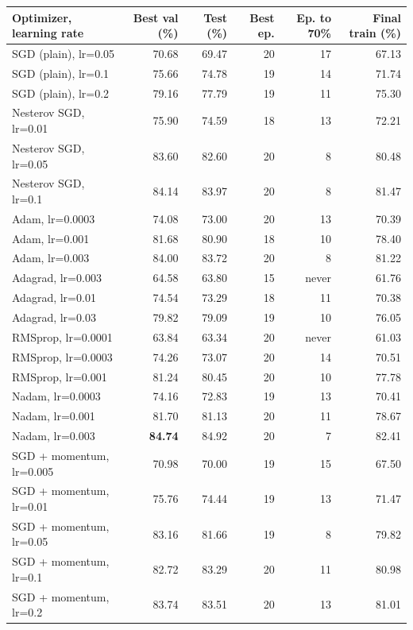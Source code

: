 \begin{tabular}{lrrrrr}
\toprule
Optimizer, learning rate & Best val (\%) & Test (\%) & Best ep. & Ep. to 70\% & Final train (\%) \\
\midrule
SGD (plain), lr=0.05 & 70.68 & 69.47 & 20 & 17 & 67.13 \\
SGD (plain), lr=0.1 & 75.66 & 74.78 & 19 & 14 & 71.74 \\
SGD (plain), lr=0.2 & 79.16 & 77.79 & 19 & 11 & 75.30 \\
Nesterov SGD, lr=0.01 & 75.90 & 74.59 & 18 & 13 & 72.21 \\
Nesterov SGD, lr=0.05 & 83.60 & 82.60 & 20 & 8 & 80.48 \\
Nesterov SGD, lr=0.1 & 84.14 & 83.97 & 20 & 8 & 81.47 \\
Adam, lr=0.0003 & 74.08 & 73.00 & 20 & 13 & 70.39 \\
Adam, lr=0.001 & 81.68 & 80.90 & 18 & 10 & 78.40 \\
Adam, lr=0.003 & 84.00 & 83.72 & 20 & 8 & 81.22 \\
Adagrad, lr=0.003 & 64.58 & 63.80 & 15 & never & 61.76 \\
Adagrad, lr=0.01 & 74.54 & 73.29 & 18 & 11 & 70.38 \\
Adagrad, lr=0.03 & 79.82 & 79.09 & 19 & 10 & 76.05 \\
RMSprop, lr=0.0001 & 63.84 & 63.34 & 20 & never & 61.03 \\
RMSprop, lr=0.0003 & 74.26 & 73.07 & 20 & 14 & 70.51 \\
RMSprop, lr=0.001 & 81.24 & 80.45 & 20 & 10 & 77.78 \\
Nadam, lr=0.0003 & 74.16 & 72.83 & 19 & 13 & 70.41 \\
Nadam, lr=0.001 & 81.70 & 81.13 & 20 & 11 & 78.67 \\
Nadam, lr=0.003 & \textbf{84.74} & 84.92 & 20 & 7 & 82.41 \\
SGD + momentum, lr=0.005 & 70.98 & 70.00 & 19 & 15 & 67.50 \\
SGD + momentum, lr=0.01 & 75.76 & 74.44 & 19 & 13 & 71.47 \\
SGD + momentum, lr=0.05 & 83.16 & 81.66 & 19 & 8 & 79.82 \\
SGD + momentum, lr=0.1 & 82.72 & 83.29 & 20 & 11 & 80.98 \\
SGD + momentum, lr=0.2 & 83.74 & 83.51 & 20 & 13 & 81.01 \\
\bottomrule
\end{tabular}
